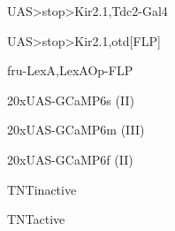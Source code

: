\documentclass[17pt]{extarticle}
\begin{document}
\newpage{}
\vspace*{\fill}\begin{footnotesize}
UAS>stop>Kir2.1,Tdc2-Gal4 \\[0.5em]
\end{footnotesize}
\footnotesize
\vspace*{\fill}
\newpage{}
\vspace*{\fill}\begin{footnotesize}
UAS>stop>Kir2.1,otd[FLP] \\[0.5em]
\end{footnotesize}
\footnotesize
\vspace*{\fill}
\newpage{}
\vspace*{\fill}\begin{small}
fru-LexA,LexAOp-FLP \\[0.5em]
\end{small}
\footnotesize
\vspace*{\fill}
\newpage{}
\vspace*{\fill}\begin{small}
20xUAS-GCaMP6s (II) \\[0.5em]
\end{small}
\footnotesize
\vspace*{\fill}
\newpage{}
\vspace*{\fill}\begin{small}
20xUAS-GCaMP6m (III) \\[0.5em]
\end{small}
\footnotesize
\vspace*{\fill}
\newpage{}
\vspace*{\fill}\begin{small}
20xUAS-GCaMP6f (II) \\[0.5em]
\end{small}
\footnotesize
\vspace*{\fill}
\newpage{}
\vspace*{\fill}\begin{normalsize}
TNTinactive \\[0.5em]
\end{normalsize}
\footnotesize
\vspace*{\fill}
\newpage{}
\vspace*{\fill}\begin{large}
TNTactive \\[0.5em]
\end{large}
\footnotesize
\vspace*{\fill}
\end{document}
